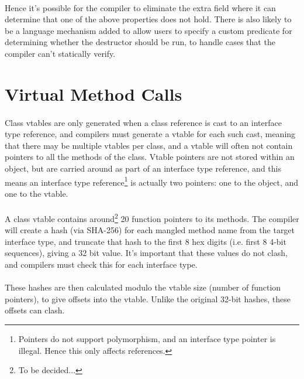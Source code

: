 \documentclass[12pt,twoside,notitlepage]{report}
\begin{document}
\paragraph{}
Hence it's possible for the compiler to eliminate the extra field where it can determine that one of the above properties does not hold. There is also likely to be a language mechanism added to allow users to specify a custom predicate for determining whether the destructor should be run, to handle cases that the compiler can't statically verify.

\section{Virtual Method Calls}

\paragraph{}
Class vtables are only generated when a class reference is cast to an interface type reference, and compilers must generate a vtable for each such cast, meaning that there may be multiple vtables per class, and a vtable will often not contain pointers to all the methods of the class. Vtable pointers are not stored within an object, but are carried around as part of an interface type reference, and this means an interface type reference\footnote{Pointers do not support polymorphism, and an interface type pointer is illegal. Hence this only affects references.} is actually two pointers: one to the object, and one to the vtable.

\paragraph{}
A class vtable contains around\footnote{To be decided...} 20 function pointers to its methods. The compiler will create a hash (via SHA-256) for each mangled method name from the target interface type, and truncate that hash to the first 8 hex digits (i.e. first 8 4-bit sequences), giving a 32 bit value. It's important that these values do not clash, and compilers must check this for each interface type.

\paragraph{}
These hashes are then calculated modulo the vtable size (number of function pointers), to give offsets into the vtable. Unlike the original 32-bit hashes, these offsets can clash.
\end{document}
